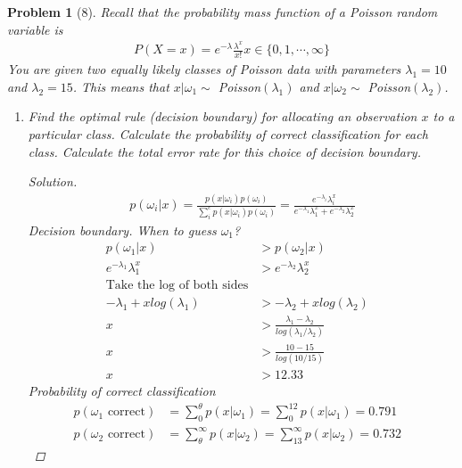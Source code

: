 \documentclass[11pt]{article}
\theoremstyle{quest}
\newtheorem*{problem}{Problem}
\newenvironment{solution}
  {\begin{mdframed}\begin{proof}[Solution]}
  {\end{proof}\end{mdframed}}
\begin{document}
\begin{problem}[8]
    Recall that the probability mass function of a Poisson random variable is
    \begin{align*}
        P(X = x) = e^{-\lambda} \frac{\lambda^x}{x!}  x \in \{0,1,\cdots,\infty\}
    \end{align*}
    You are given two equally likely classes of Poisson data with parameters $\lambda_1 = 10$ and $\lambda_2 = 15$. This means that $x|\omega_1 \sim $ Poisson$(\lambda_1)$ and $x|\omega_2 \sim $ Poisson$(\lambda_2)$.
    \begin{enumerate}[label=(\alph*)]
        \item Find the optimal rule (decision boundary) for allocating an observation $x$ to a particular class. Calculate the probability of correct classification for each class. Calculate the total error rate for this choice of decision boundary.
            \begin{solution}
                \begin{align*}
                    p(\omega_i|x) = \frac{p(x|\omega_i)p(\omega_i)}{\sum_i^c p(x|\omega_i)p(\omega_i)} = \frac{e^{-\lambda_i}\lambda_i^x}{e^{-\lambda_1}\lambda_1^x + e^{-\lambda_2}\lambda_2^x}
                \end{align*}
                Decision boundary. When to guess $\omega_1$?
                \begin{align*}
                    p(\omega_1|x) &> p(\omega_2|x) & \\
                    e^{-\lambda_1}\lambda_1^x &> e^{-\lambda_2}\lambda_2^x & \\
                    \text{Take the log of both sides} & \\
                    -\lambda_1 + x log(\lambda_1) &> -\lambda_2 + x log(\lambda_2) &\\
                    x &> \frac{\lambda_1 - \lambda_2}{log(\lambda_1 / \lambda_2)} &\\
                    x &> \frac{10 - 15}{log(10 / 15)} &\\
                    x &> 12.33
                \end{align*}
                Probability of correct classification
                \begin{align*}
                    p(\omega_1 \text{ correct}) &= \sum_0^\theta p(x|\omega_1) = \sum_0^{12} p(x|\omega_1) = 0.791 &\\
                    p(\omega_2 \text{ correct}) &= \sum_\theta^\infty p(x|\omega_2) = \sum_{13}^\infty p(x|\omega_2) = 0.732                    

\end{align*}
\end{solution}
\end{enumerate}
\end{problem}
\end{document}
